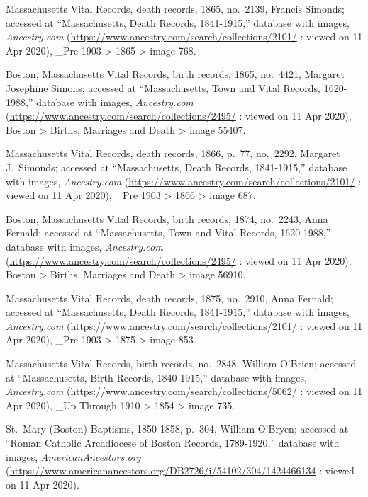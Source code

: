 \begin{thebibliography}{999}
Massachusetts Vital Records, death records, 1865, no.\ 2139, Francis Simonds; accessed at ``Massachusetts, Death Records, 1841-1915,'' database with images, \textit{Ancestry.com} (\url{https://www.ancestry.com/search/collections/2101/} : viewed on 11 Apr 2020), \_Pre 1903 > 1865 > image 768.

Boston, Massachusetts Vital Records, birth records, 1865, no.\ 4421, Margaret Josephine Simons; accessed at ``Massachusetts, Town and Vital Records, 1620-1988,'' database with images, \textit{Ancestry.com} (\url{https://www.ancestry.com/search/collections/2495/} : viewed on 11 Apr 2020), Boston > Births, Marriages and Death > image 55407.

Massachusetts Vital Records, death records, 1866, p.\ 77, no.\ 2292, Margaret J.\ Simonds; accessed at ``Massachusetts, Death Records, 1841-1915,'' database with images, \textit{Ancestry.com} (\url{https://www.ancestry.com/search/collections/2101/} : viewed on 11 Apr 2020), \_Pre 1903 > 1866 > image 687.

Boston, Massachusetts Vital Records, birth records, 1874, no.\ 2243, Anna Fernald; accessed at ``Massachusetts, Town and Vital Records, 1620-1988,'' database with images, \textit{Ancestry.com} (\url{https://www.ancestry.com/search/collections/2495/} : viewed on 11 Apr 2020), Boston > Births, Marriages and Death > image 56910.

Massachusetts Vital Records, death records, 1875, no.\ 2910, Anna Fernald; accessed at ``Massachusetts, Death Records, 1841-1915,'' database with images, \textit{Ancestry.com} (\url{https://www.ancestry.com/search/collections/2101/} : viewed on 11 Apr 2020), \_Pre 1903 > 1875 > image 853.


Massachusetts Vital Records, birth records, no.\ 2848, William O'Brien; accessed at ``Massachusetts, Birth Records, 1840-1915,'' database with images, \textit{Ancestry.com} (\url{https://www.ancestry.com/search/collections/5062/} : viewed on 11 Apr 2020), \_Up Through 1910 > 1854 > image 735.

St.\ Mary (Boston) Baptisms, 1850-1858, p.\ 304, William O'Bryen; accessed at ``Roman Catholic Archdiocese of Boston Records, 1789-1920,'' database with images, \textit{AmericanAncestors.org} (\url{https://www.americanancestors.org/DB2726/i/54102/304/1424466134} : viewed on 11 Apr 2020).


\end{thebibliography}
